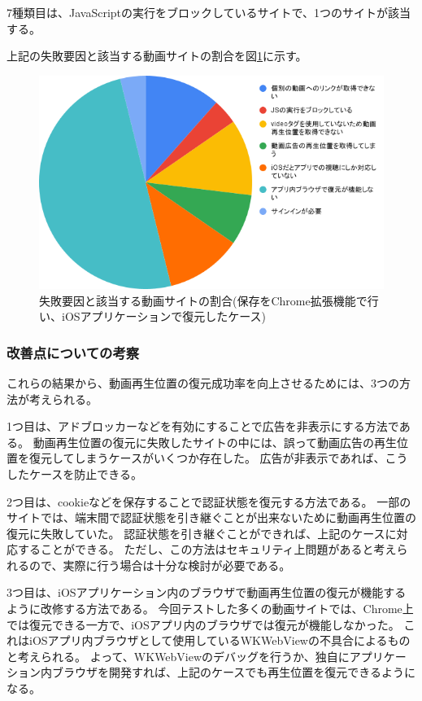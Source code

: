7種類目は、JavaScriptの実行をブロックしているサイトで、1つのサイトが該当する。

上記の失敗要因と該当する動画サイトの割合を図\ref{fig:evl-consideration-video-cause-ratio-chrome-ios}に示す。

\begin{figure}[htbp]
  \label{fig:evl-consideration-video-cause-ratio-chrome-ios}
  \begin{center}
    \includegraphics[bb=0 0 600 371,width=15cm]{img/060_evaluation/consideration/video/cause-ratio-chrome-ios.pdf}
  \end{center}
  \caption{失敗要因と該当する動画サイトの割合(保存をChrome拡張機能で行い、iOSアプリケーションで復元したケース)}
\end{figure}

\subsubsection{改善点についての考察}
これらの結果から、動画再生位置の復元成功率を向上させるためには、3つの方法が考えられる。

1つ目は、アドブロッカーなどを有効にすることで広告を非表示にする方法である。
動画再生位置の復元に失敗したサイトの中には、誤って動画広告の再生位置を復元してしまうケースがいくつか存在した。
広告が非表示であれば、こうしたケースを防止できる。

2つ目は、cookieなどを保存することで認証状態を復元する方法である。
一部のサイトでは、端末間で認証状態を引き継ぐことが出来ないために動画再生位置の復元に失敗していた。
認証状態を引き継ぐことができれば、上記のケースに対応することができる。
ただし、この方法はセキュリティ上問題があると考えられるので、実際に行う場合は十分な検討が必要である。

3つ目は、iOSアプリケーション内のブラウザで動画再生位置の復元が機能するように改修する方法である。
今回テストした多くの動画サイトでは、Chrome上では復元できる一方で、iOSアプリ内のブラウザでは復元が機能しなかった。
これはiOSアプリ内ブラウザとして使用しているWKWebViewの不具合によるものと考えられる。
よって、WKWebViewのデバッグを行うか、独自にアプリケーション内ブラウザを開発すれば、上記のケースでも再生位置を復元できるようになる。
